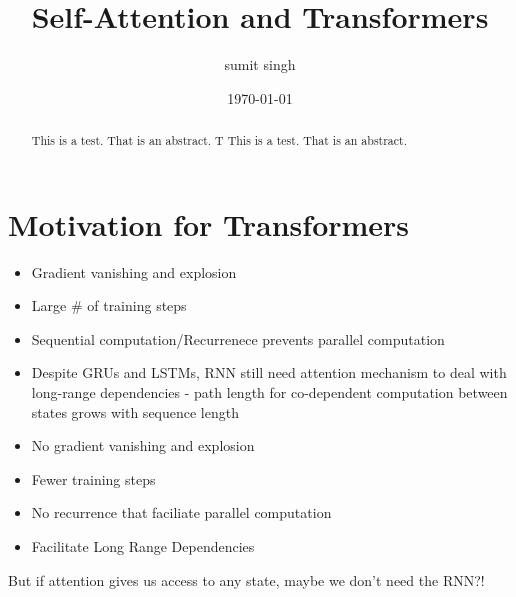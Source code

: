 \documentclass{article}
\title{Self-Attention and Transformers}
\author{sumit singh}
\date{\today}
\begin{document}
\maketitle
\begin{abstract}
\noindent
This is a test. That is an abstract.  T This is a test. That is an abstract. 

\end{abstract}

\hspace{0.5in}
\section{Motivation for Transformers}
\begin{tcbraster}[raster columns=2,raster equal height,nobeforeafter,raster column skip=0.5cm]
  \begin{tcolorbox}[title=Challenges with RNNs]
    \begin{itemize}
    \item Gradient vanishing and explosion
    \item Large \# of training steps
    \item Sequential computation/Recurrenece prevents parallel computation
    \item Despite GRUs and LSTMs, RNN still need attention mechanism to deal with long-range dependencies - path length for co-dependent computation between states grows with sequence length
\end{itemize}
  \end{tcolorbox}
  \begin{tcolorbox}[title=Transformer Networks]
    \begin{itemize}
    
    \item No gradient vanishing and explosion
    \item Fewer training steps
    \item No recurrence that faciliate parallel computation
    \item Facilitate Long Range Dependencies
\end{itemize}
  \end{tcolorbox}
\end{tcbraster}
But if attention gives us access to any state, maybe we don't need the RNN?!
\end{document}

